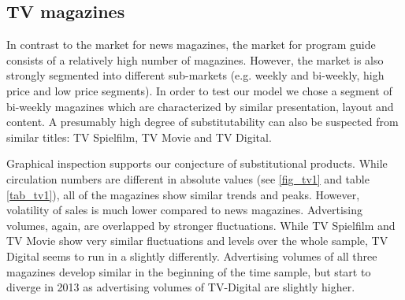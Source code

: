 \documentclass[12pt,a4paper,notitlepage]{article}
\begin{document}
\subsection{TV magazines}

In contrast to the market for news magazines, the market for program guide consists of a relatively high number of magazines. However, the market is also strongly segmented into different sub-markets (e.g. weekly and bi-weekly, high price and low price segments). In order to test our model we chose a segment of bi-weekly magazines which are characterized by similar presentation, layout and content. A presumably high degree of substitutability can also be suspected from similar titles: TV Spielfilm, TV Movie and TV Digital.  

Graphical inspection supports our conjecture of substitutional products. While circulation numbers are different in absolute values (see \ref{fig_tv1} and table \ref{tab_tv1}), all of the magazines show similar trends and peaks. However, volatility of sales is much lower compared to news magazines. Advertising volumes, again, are overlapped by stronger fluctuations. While TV Spielfilm and TV Movie show very similar fluctuations and levels over the whole sample, TV Digital seems to run in a slightly differently. Advertising volumes of all three magazines develop similar in the beginning of the time sample, but start to diverge in 2013 as advertising volumes of TV-Digital are slightly higher. 

%	
%	
\end{document}
